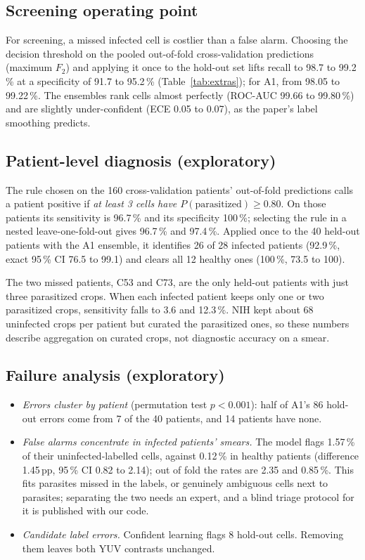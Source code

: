 \documentclass[conference]{IEEEtran}
\begin{document}
\subsection{Screening operating point}
For screening, a missed infected cell is costlier than a false alarm. Choosing the decision threshold on the pooled out-of-fold cross-validation predictions (maximum $F_2$) and applying it once to the hold-out set lifts recall to 98.7 to 99.2\,\% at a specificity of 91.7 to 95.2\,\% (Table~\ref{tab:extras}); for A1, from 98.05 to 99.22\,\%. The ensembles rank cells almost perfectly (ROC-AUC 99.66 to 99.80\,\%) and are slightly under-confident (ECE 0.05 to 0.07), as the paper's label smoothing predicts.

\subsection{Patient-level diagnosis (exploratory)}
The rule chosen on the 160 cross-validation patients' out-of-fold predictions calls a patient positive if \emph{at least 3 cells have $P(\text{parasitized})\ge0.80$}. On those patients its sensitivity is 96.7\,\% and its specificity 100\,\%; selecting the rule in a nested leave-one-fold-out gives 96.7\,\% and 97.4\,\%. Applied once to the 40 held-out patients with the A1 ensemble, it identifies 26 of 28 infected patients (92.9\,\%, exact 95\,\% CI 76.5 to 99.1) and clears all 12 healthy ones (100\,\%, 73.5 to 100).

The two missed patients, C53 and C73, are the only held-out patients with just three parasitized crops. When each infected patient keeps only one or two parasitized crops, sensitivity falls to 3.6 and 12.3\,\%. NIH kept about 68 uninfected crops per patient but curated the parasitized ones, so these numbers describe aggregation on curated crops, not diagnostic accuracy on a smear.

\subsection{Failure analysis (exploratory)}
\begin{itemize}
\item \emph{Errors cluster by patient} (permutation test $p<0.001$): half of A1's 86 hold-out errors come from 7 of the 40 patients, and 14 patients have none.
\item \emph{False alarms concentrate in infected patients' smears.} The model flags 1.57\,\% of their uninfected-labelled cells, against 0.12\,\% in healthy patients (difference 1.45\,pp, 95\,\% CI 0.82 to 2.14); out of fold the rates are 2.35 and 0.85\,\%. This fits parasites missed in the labels, or genuinely ambiguous cells next to parasites; separating the two needs an expert, and a blind triage protocol for it is published with our code.
\item \emph{Candidate label errors.} Confident learning flags 8 hold-out cells. Removing them leaves both YUV contrasts unchanged.
\end{itemize}
\end{document}
